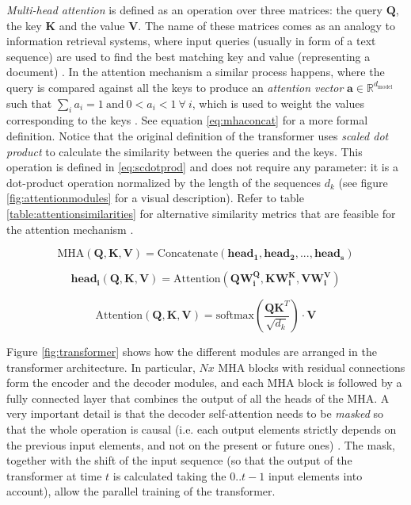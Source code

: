 \textit{Multi-head attention} is defined as an operation over three matrices: the query $\mathbf{Q}$, the key $\mathbf{K}$ and the value $\mathbf{V}$. The name of these matrices comes as an analogy to information retrieval systems, where input queries (usually in form of a text sequence) are used to find the best matching key and value (representing a document) \autocite{manning2008}. In the attention mechanism a similar process happens, where the query is compared against all the keys to produce an \textit{attention vector} $\mathbf{a} \in \mathbb{R}^{d_{\mathrm{model}}}$ such that $\sum_{i} a_i = 1\ \mathrm{and}\ 0<a_i<1\ \forall\ i$, which is used to weight the values corresponding to the keys \autocite{vaswani2017}. See equation \ref{eq:mhaconcat} for a more formal definition. Notice that the original definition of the transformer \autocite{vaswani2017} uses \textit{scaled dot product}  to calculate the similarity between the queries and the keys. This operation is defined in \ref{eq:scdotprod} and does not require any parameter: it is a dot-product operation normalized by the length of the sequences $d_k$ (see figure \ref{fig:attentionmodules} for a visual description). Refer to table \ref{table:attentionsimilarities} for alternative similarity metrics that are feasible for the attention mechanism \autocite{uday2019}.

 \begin{equation}
 \label{eq:mhaconcat}
 \mathrm{MHA}(\mathbf{Q, K, V}) = \mathrm{Concatenate}(\mathrm{\mathbf{head_1}},\mathrm{\mathbf{head_2}},...,\mathrm{\mathbf{head_s}})
 \end{equation}


 \begin{equation}
 \label{eq:headsdef}
 \mathrm{\mathbf{head_i}}(\mathbf{Q,K,V}) = \mathrm{Attention}(\mathbf{Q} \mathbf{W^Q_i}, \mathbf{K} \mathbf{W^K_i}, \mathbf{V} \mathbf{W^V_i})
 \end{equation}

 \begin{equation}
 \label{eq:scdotprod}
 \mathrm{Attention}(\mathbf{Q, K, V}) = \mathrm{softmax} \left(\frac{\mathbf{QK}^T}{\sqrt{d_k}}\right) \cdot \mathbf{V}
 \end{equation}



Figure \ref{fig:transformer} shows how the different modules are arranged in the transformer architecture. In particular, $Nx$ MHA blocks with residual connections form the encoder and the decoder modules, and each MHA block is followed by a fully connected layer that combines the output of all the heads of the MHA. A very important detail is that the decoder self-attention needs to be \textit{masked} so that the whole operation is causal (i.e. each output elements strictly depends on the previous input elements, and not on the present or future ones) \autocite{vaswani2017}. The mask, together with the shift of the input sequence (so that the output of the transformer at time $t$ is calculated taking the $0..t-1$ input elements into account), allow the parallel training of the transformer.

